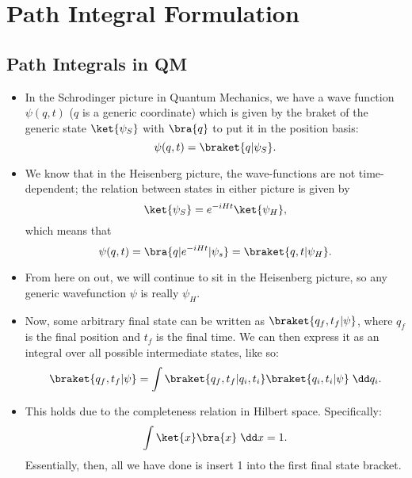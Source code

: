 \section{Path Integral Formulation}

\subsection*{Path Integrals in QM}

\begin{itemize}
    \item In the Schrodinger picture in Quantum Mechanics, we have a wave function $\psi(q, t)$ ($q$ is a generic coordinate) which is given by the braket of the generic state $\ket{\psi_S}$ with $\bra{q}$ to put it in the position basis:
        \begin{equation}
            \psi(q,t) = \braket{q | \psi_S}.
        \end{equation}
    \item We know that in the Heisenberg picture, the wave-functions are not time-dependent; the relation between states in either picture is given by
        \begin{equation}
            \ket{\psi_S} = e^{-iHt}\ket{\psi_H},
        \end{equation}
        which means that
        \begin{equation}
            \psi(q,t) = \bra{q | e^{-iHt} | \psi_s} = \braket{q,t | \psi_H}.
        \end{equation}
    \item From here on out, we will continue to sit in the Heisenberg picture, so any generic wavefunction $\psi$ is really $\psi_H$.
    \item Now, some arbitrary final state can be written as $\braket{q_f,t_f | \psi}$, where $q_f$ is the final position and $t_f$ is the final time. We can then express it as an integral over all possible intermediate states, like so:
        \begin{equation}
            \braket{q_f,t_f | \psi} = \int \braket{q_f,t_f | q_i,t_i}\braket{q_i,t_i | \psi} \;\dd q_i.
        \end{equation}
    \item This holds due to the completeness relation in Hilbert space. Specifically:
        \begin{equation}
            \int \ket{x}\bra{x} \;\dd x = 1.
        \end{equation}
        Essentially, then, all we have done is insert 1 into the first final state bracket.

\end{itemize}
